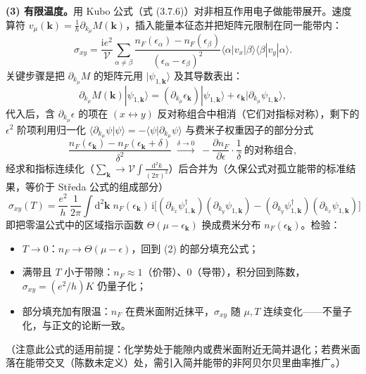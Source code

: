 \textbf{(3) 有限温度。}用 Kubo 公式（式 (3.7.6)）对非相互作用电子做能带展开。速度算符 $v_\mu(\pmb k)=\frac{1}{\hbar}\partial_{k_\mu}M(\pmb k)$，插入能量本征态并把矩阵元限制在同一能带内：
\begin{equation*}
\sigma_{xy}=\frac{\mathrm{i}e^2}{\mathcal V}\sum_{\alpha\neq\beta}
\frac{n_F(\epsilon_\alpha)-n_F(\epsilon_\beta)}{(\epsilon_\alpha-\epsilon_\beta)^2}
\langle\alpha|v_x|\beta\rangle\langle\beta|v_y|\alpha\rangle .
\end{equation*}
关键步骤是把 $\partial_{k_\mu}M$ 的矩阵元用 $|\psi_{1,\pmb k}\rangle$ 及其导数表出：
\begin{equation*}
\partial_{k_\mu}M(\pmb k)|\psi_{1,\pmb k}\rangle
=(\partial_{k_\mu}\epsilon_{\pmb k})|\psi_{1,\pmb k}\rangle+\epsilon_{\pmb k}|\partial_{k_\mu}\psi_{1,\pmb k}\rangle,
\end{equation*}
代入后，含 $\partial_{k_\mu}\epsilon$ 的项在 $(x\leftrightarrow y)$ 反对称组合中相消（它们对指标对称），剩下的 $\epsilon^2$ 阶项利用归一化 $\langle\partial_{k_\mu}\psi|\psi\rangle=-\langle\psi|\partial_{k_\mu}\psi\rangle$ 与费米子权重因子的部分分式
\begin{equation*}
\frac{n_F(\epsilon_{\pmb k})-n_F(\epsilon_{\pmb k}+\delta)}{\delta^2}\;\xrightarrow{\delta\to0}\;-\frac{\partial n_F}{\partial\epsilon}\cdot\frac{1}{\delta}\ \text{的对称组合},
\end{equation*}
经求和指标连续化（$\sum_{\pmb k}\to\mathcal V\int\frac{\mathrm{d}^2k}{(2\pi)^2}$）后合并为（久保公式对孤立能带的标准结果，等价于 St\v{r}eda 公式的组成部分）
\begin{equation*}
\boxed{\;\sigma_{xy}(T)=\frac{e^2}{h}\,\frac{1}{2\pi}\int\mathrm{d}^2\pmb k\;n_F(\epsilon_{\pmb k})\,
\mathrm{i}\big[(\partial_{k_x}\psi^\dagger_{1,\pmb k})(\partial_{k_y}\psi_{1,\pmb k})-(\partial_{k_y}\psi^\dagger_{1,\pmb k})(\partial_{k_x}\psi_{1,\pmb k})\big]\;}
\end{equation*}
即把零温公式中的区域指示函数 $\Theta(\mu-\epsilon_{\pmb k})$ 换成费米分布 $n_F(\epsilon_{\pmb k})$。检验：
\begin{itemize}
\item $T\to0$：$n_F\to\Theta(\mu-\epsilon)$，回到 (2) 的部分填充公式；
\item 满带且 $T$ 小于带隙：$n_F\approx1$（价带）、$0$（导带），积分回到陈数，$\sigma_{xy}=(e^2/h)K$ 仍量子化；
\item 部分填充加有限温：$n_F$ 在费米面附近抹平，$\sigma_{xy}$ 随 $\mu,T$ 连续变化——不量子化，与正文的论断一致。
\end{itemize}
（注意此公式的适用前提：化学势处于能隙内或费米面附近无简并退化；若费米面落在能带交叉（陈数未定义）处，需引入简并能带的非阿贝尔贝里曲率推广。）
